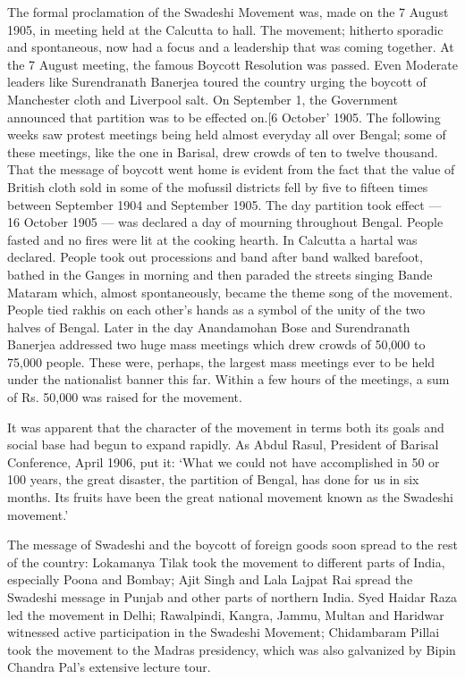 The formal proclamation of the Swadeshi Movement was, made on the 7 August 1905, in meeting held at the Calcutta to hall. The movement; hitherto sporadic and spontaneous, now had a focus and a leadership that was coming together. At the 7 August meeting, the famous Boycott Resolution was passed. Even Moderate leaders like Surendranath Banerjea toured the country urging the boycott of Manchester cloth and Liverpool salt. On September 1, the Government announced that partition was to be effected on.[6 October' 1905. The following weeks saw protest meetings being held almost everyday all over Bengal; some of these meetings, like the one in Barisal, drew crowds of ten to twelve thousand. That the message of boycott went home is evident from the fact that the value of British cloth sold in some of the mofussil districts fell by five to fifteen times between September 1904 and September 1905. The day partition took effect — 16 October 1905 — was declared a day of mourning throughout Bengal. People fasted and no fires were lit at the cooking hearth. In Calcutta a hartal was declared. People took out processions and band after band walked barefoot, bathed in the Ganges in morning and then paraded the streets singing Bande Mataram which, almost spontaneously, became the theme song of the movement. People tied rakhis on each other's hands as a symbol of the unity of the two halves of Bengal. Later in the day Anandamohan Bose and Surendranath Banerjea addressed two huge mass meetings which drew crowds of 50,000 to 75,000 people. These were, perhaps, the largest mass meetings ever to be held under the nationalist banner this far. Within a few hours of the meetings, a sum of Rs. 50,000 was raised for the movement.

It was apparent that the character of the movement in terms both its goals and social base had begun to expand rapidly. As Abdul Rasul, President of Barisal Conference, April 1906, put it: `What we could not have accomplished in 50 or 100 years, the great disaster, the partition of Bengal, has done for us in six months. Its fruits have been the great national movement known as the Swadeshi movement.'

The message of Swadeshi and the boycott of foreign goods soon spread to the rest of the country: Lokamanya Tilak took the movement to different parts of India, especially Poona and Bombay; Ajit Singh and Lala Lajpat Rai spread the Swadeshi message in Punjab and other parts of northern India. Syed Haidar Raza led the movement in Delhi; Rawalpindi, Kangra, Jammu, Multan and Haridwar witnessed active participation in the Swadeshi Movement; Chidambaram Pillai took the movement to the Madras presidency, which was also galvanized by Bipin Chandra Pal's extensive lecture tour.

